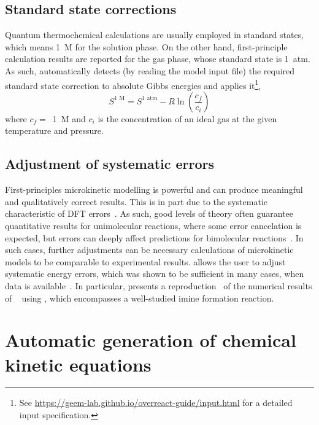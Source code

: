 \subsection{Standard state corrections}

Quantum thermochemical calculations are usually employed in standard states,
which means 1~M for the solution phase.
On the other hand,
first-principle calculation results are reported for the gas phase,
whose standard state is 1~atm.
As such,
\overreact automatically detects (by reading the model input file) the required standard state correction to absolute Gibbs energies and applies it\footnote{See \url{https://geem-lab.github.io/overreact-guide/input.html} for a detailed input specification.},
% 
\begin{equation}
	S^\text{1~M} = S^\text{1~atm}
	- R \ln{\left( \frac{c_f}{c_i} \right)}
\end{equation}
% 
where $c_f =$~1~M and $c_i$ is the concentration of an ideal gas at the given temperature and pressure.

\subsection{Adjustment of systematic errors}

First-principles microkinetic modelling is powerful and can produce meaningful and qualitatively correct results.
This is in part due to the systematic characteristic of DFT errors~\cite{P_rez_Soto_2020}.
As such,
good levels of theory often guarantee quantitative results for unimolecular reactions,
where some error cancelation is expected,
but errors can deeply affect predictions for bimolecular reactions~\cite{P_rez_Soto_2020}.
In such cases,
further adjustments can be necessary calculations of microkinetic models to be comparable to experimental results.
\overreact allows the user to adjust systematic energy errors,
which was shown to be sufficient in many cases,
when data is available~\cite{Ahn_2019,P_rez_Soto_2020}.
In particular,
\citeauthor{Schneider_2022} presents a reproduction~\cite{Schneider_2022} of the numerical results of \citeauthor{P_rez_Soto_2020}~\cite{P_rez_Soto_2020} using \overreact,
which encompasses a well-studied imine formation reaction.

\section{Automatic generation of chemical kinetic equations}

